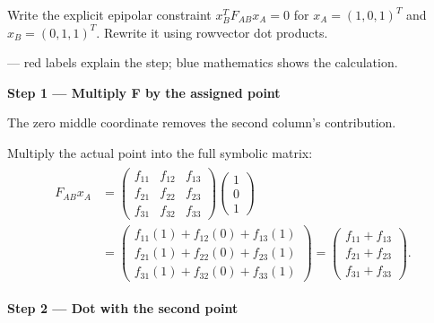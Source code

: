 \documentclass[letterpaper,11pt,english,openany,oneside]{jupyterBook}
\begin{document}
\sphinxAtStartPar
Write the explicit epipolar constraint \(x_B^TF_{AB}x_A=0\) for \(x_A=(1,0,1)^T\) and \(x_B=(0,1,1)^T\). Rewrite it using row\sphinxhyphen{}vector dot products.

\par\medskip

\sphinxAtStartPar
{} — red labels explain the step; blue mathematics shows the calculation.

\par\medskip{}
{\color{QuizStepRed}\bfseries Step 1 — Multiply F by the assigned point}\par\smallskip

\sphinxAtStartPar
{} The zero middle coordinate removes the second column’s contribution.

\sphinxAtStartPar
Multiply the actual point into the full symbolic matrix:
{\color{QuizMathBlue} \begin{equation*}
\begin{split}
\begin{aligned}
F_{AB}x_A&=\begin{pmatrix}f_{11}&f_{12}&f_{13}\\f_{21}&f_{22}&f_{23}\\f_{31}&f_{32}&f_{33}\end{pmatrix}\begin{pmatrix}1\\0\\1\end{pmatrix}\\
&=\begin{pmatrix}f_{11}(1)+f_{12}(0)+f_{13}(1)\\f_{21}(1)+f_{22}(0)+f_{23}(1)\\f_{31}(1)+f_{32}(0)+f_{33}(1)\end{pmatrix}
=\begin{pmatrix}f_{11}+f_{13}\\f_{21}+f_{23}\\f_{31}+f_{33}\end{pmatrix}.
\end{aligned}
\end{split}
\end{equation*}}
\par

\par\medskip{}
{\color{QuizStepRed}\bfseries Step 2 — Dot with the second point}\par\smallskip
\end{document}
